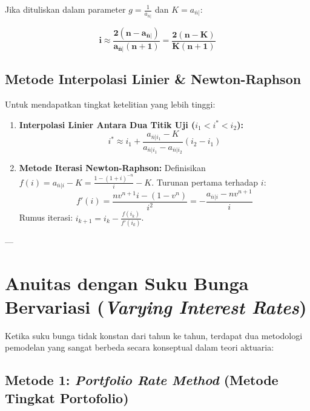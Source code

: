 \documentclass[11pt,a4paper]{article}
\begin{document}
Jika dituliskan dalam parameter $g = \frac{1}{a_{\overline{n}|}}$ dan $K = a_{\overline{n}|}$:
\begin{definitionbox}
\begin{equation}
    \mathbf{i \approx \frac{2(n - a_{\overline{n}|})}{a_{\overline{n}|}(n + 1)} = \frac{2(n - K)}{K(n + 1)}}
\end{equation}
\end{definitionbox}

\subsection{Metode Interpolasi Linier \& Newton-Raphson}
Untuk mendapatkan tingkat ketelitian yang lebih tinggi:
\begin{enumerate}[label=\alph*.]
    \item \textbf{Interpolasi Linier Antara Dua Titik Uji ($i_1 < i^* < i_2$):}
    \begin{equation}
        i^* \approx i_1 + \frac{a_{\overline{n}|i_1} - K}{a_{\overline{n}|i_1} - a_{\overline{n}|i_2}} (i_2 - i_1)
    \end{equation}
    \item \textbf{Metode Iterasi Newton-Raphson:}
    Definisikan $f(i) = a_{\overline{n}|i} - K = \frac{1 - (1+i)^{-n}}{i} - K$.
    Turunan pertama terhadap $i$:
    \begin{equation}
        f'(i) = \frac{n v^{n+1} i - (1 - v^n)}{i^2} = -\frac{a_{\overline{n}|i} - n v^{n+1}}{i}
    \end{equation}
    Rumus iterasi: $i_{k+1} = i_k - \frac{f(i_k)}{f'(i_k)}$.
\end{enumerate}

---

\section{Anuitas dengan Suku Bunga Bervariasi (\textit{Varying Interest Rates})}

Ketika suku bunga tidak konstan dari tahun ke tahun, terdapat dua metodologi pemodelan yang sangat berbeda secara konseptual dalam teori aktuaria:

\subsection{Metode 1: \textit{Portfolio Rate Method} (Metode Tingkat Portofolio)}
\end{document}
